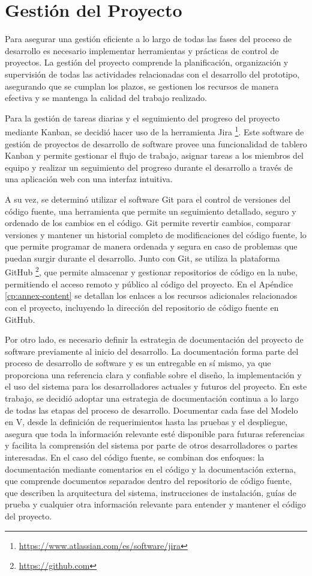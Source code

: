\section{Gestión del Proyecto}

Para asegurar una gestión eficiente a lo largo de todas las fases del proceso de desarrollo es necesario implementar herramientas y prácticas de control de proyectos. La gestión del proyecto comprende la planificación, organización y supervisión de todas las actividades relacionadas con el desarrollo del prototipo, asegurando que se cumplan los plazos, se gestionen los recursos de manera efectiva y se mantenga la calidad del trabajo realizado.

Para la gestión de tareas diarias y el seguimiento del progreso del proyecto mediante Kanban, se decidió hacer uso de la herramienta Jira \footnote{\url{https://www.atlassian.com/es/software/jira}}. Este software de gestión de proyectos de desarrollo de software provee una funcionalidad de tablero Kanban y permite gestionar el flujo de trabajo, asignar tareas a los miembros del equipo y realizar un seguimiento del progreso durante el desarrollo a través de una aplicación web con una interfaz intuitiva. 

A su vez, se determinó utilizar el software Git para el control de versiones del código fuente, una herramienta que permite un seguimiento detallado, seguro y ordenado de los cambios en el código. Git permite revertir cambios, comparar versiones y mantener un historial completo de modificaciones del código fuente, lo que permite programar de manera ordenada y segura en caso de problemas que puedan surgir durante el desarrollo. Junto con Git, se utiliza la plataforma GitHub \footnote{\url{https://github.com}}, que permite almacenar y gestionar repositorios de código en la nube, permitiendo el acceso remoto y público al código del proyecto. En el Apéndice \ref{cp:annex-content} se detallan los enlaces a los recursos adicionales relacionados con el proyecto, incluyendo la dirección del repositorio de código fuente en GitHub.

Por otro lado, es necesario definir la estrategia de documentación del proyecto de software previamente al inicio del desarrollo. La documentación forma parte del proceso de desarrollo de software y es un entregable en sí mismo, ya que proporciona una referencia clara y confiable sobre el diseño, la implementación y el uso del sistema para los desarrolladores actuales y futuros del proyecto. En este trabajo, se decidió adoptar una estrategia de documentación continua a lo largo de todas las etapas del proceso de desarrollo. Documentar cada fase del Modelo en V, desde la definición de requerimientos hasta las pruebas y el despliegue, asegura que toda la información relevante esté disponible para futuras referencias y facilita la comprensión del sistema por parte de otros desarrolladores o partes interesadas. En el caso del código fuente, se combinan dos enfoques: la documentación mediante comentarios en el código y la documentación externa, que comprende documentos separados dentro del repositorio de código fuente, que describen la arquitectura del sistema, instrucciones de instalación, guías de prueba y cualquier otra información relevante para entender y mantener el código del proyecto.

